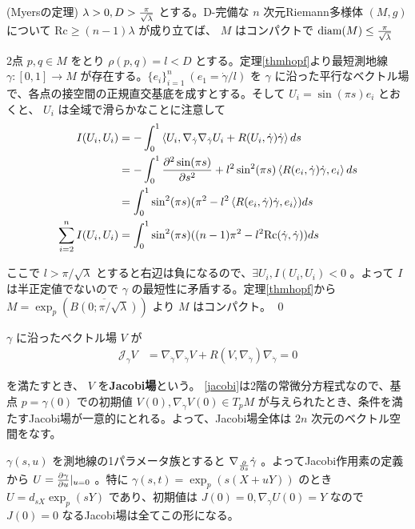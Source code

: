 \documentclass[dvipdfmx,a4paper]{jsreport}
\theoremstyle{definition}
\newcommand{\der}{\partial}
\renewcommand{\bar}{\overline}
\begin{document}
\thm\label{thmmyers} (Myersの定理) $\lambda>0,D>{\pi \over \sqrt{\lambda}}$ とする。D-完備な $n$ 次元Riemann多様体 $(M,g)$ について $\mbox{Rc} \geq (n-1)\lambda$ が成り立てば、 $M$ はコンパクトで $\mbox{diam}(M) \leq {\pi \over \sqrt{\lambda}}$ 

\prf 2点 $p,q \in M$ をとり $\rho(p,q)=l<D$ とする。定理\ref{thmhopf}より最短測地線 $\gamma:[0,1] \to M$ が存在する。$\{e_i\}_{i=1}^n \ (e_1=\dot{\gamma}/l)$ を $\gamma$ に沿った平行なベクトル場で、各点の接空間の正規直交基底を成すとする。そして $U_i=\sin(\pi s)e_i$ とおくと、 $U_i$ は全域で滑らかなことに注意して
\begin{align*}
    I(U_i,U_i) &=-\int_0^1 \ev{U_i,\nabla_{\dot{\gamma}}\nabla_{\dot{\gamma}}U_i+R(U_i,\dot{\gamma})\dot{\gamma}} ds \\
    &=-\int_0^1 {\der^2 \sin(\pi s) \over \der s^2}+l^2\sin^2(\pi s) \ev{R(e_i,\dot{\gamma})\dot{\gamma},e_i} ds \\
    &=\int_0^1 \sin^2(\pi s)(\pi^2-l^2 \ev{R(e_i,\dot{\gamma})\dot{\gamma},e_i}) ds \\
    \sum_{i=2}^n I(U_i,U_i) &=\int_0^1 \sin^2(\pi s)((n-1)\pi^2-l^2 \mbox{Rc}(\dot{\gamma},\dot{\gamma})) ds
\end{align*}

ここで $l>\pi/\sqrt{\lambda}$ とすると右辺は負になるので、$\exists U_i,I(U_i,U_i)<0$ 。よって $I$ は半正定値でないので $\gamma$ の最短性に矛盾する。定理\ref{thmhopf}から $M=\exp_p(\bar{B(0;\pi/\sqrt{\lambda})})$ より $M$ はコンパクト。 \qed

 $\gamma$ に沿ったベクトル場 $V$ が 
\begin{align}\label{jacobi}
    \mathcal{J}_\gamma V &=\nabla_{\dot{\gamma}}\nabla_{\dot{\gamma}}V+R(V,\nabla_{\dot{\gamma}})\nabla_{\dot{\gamma}}=0
\end{align}

を満たすとき、 $V$ を\textbf{Jacobi場}という。
\ref{jacobi}は2階の常微分方程式なので、基点 $p=\gamma(0)$ での初期値 $V(0),\nabla_{\dot{\gamma}}V(0) \in T_pM$ が与えられたとき、条件を満たすJacobi場が一意的にとれる。よって、Jacobi場全体は $2n$ 次元のベクトル空間をなす。

\eg\label{egjacobi} $\gamma(s,u)$ を測地線の1パラメータ族とすると $\nabla_{\der \over \der s} \dot{\gamma}$ 。よってJacobi作用素の定義から $U={\der \gamma \over \der u}|_{u=0}$ 。特に $\gamma(s,t)=\exp_p (s(X+uY))$ のとき $U=d_{sX}\exp_{p}(sY)$ であり、初期値は $J(0)=0,\nabla_{\dot{\gamma}}U(0)=Y$ なので $J(0)=0$ なるJacobi場は全てこの形になる。
\end{document}
